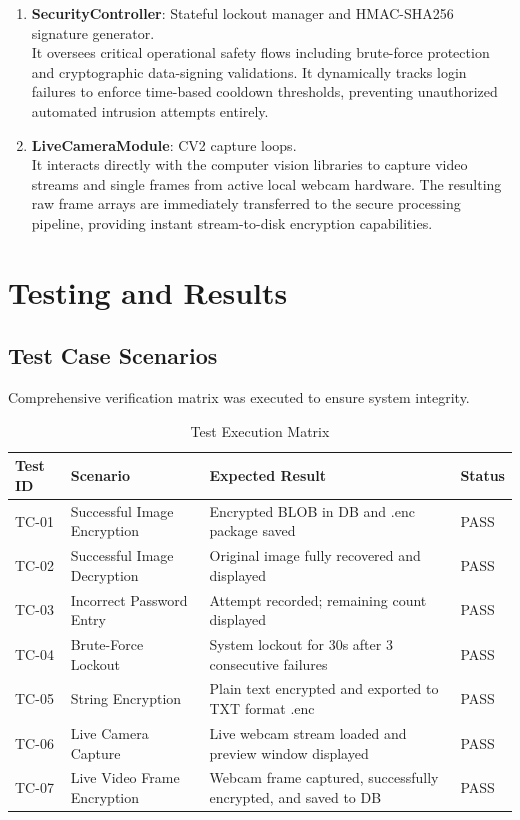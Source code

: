 \documentclass[12pt,a4paper]{report}
\begin{document}
\begin{enumerate}
    \item \textbf{SecurityController}: Stateful lockout manager and HMAC-SHA256 signature generator. \\
    It oversees critical operational safety flows including brute-force protection and cryptographic data-signing validations. It dynamically tracks login failures to enforce time-based cooldown thresholds, preventing unauthorized automated intrusion attempts entirely.
    
    \item \textbf{LiveCameraModule}: CV2 capture loops. \\
    It interacts directly with the computer vision libraries to capture video streams and single frames from active local webcam hardware. The resulting raw frame arrays are immediately transferred to the secure processing pipeline, providing instant stream-to-disk encryption capabilities.
\end{enumerate}

\chapter{Testing and Results}

\section{Test Case Scenarios}
Comprehensive verification matrix was executed to ensure system integrity.

\begin{table}[h]
\centering
\caption{Test Execution Matrix}
\begin{tabular}{|m{2cm}|m{4cm}|m{4cm}|m{3cm}|}
\hline
\textbf{Test ID} & \textbf{Scenario} & \textbf{Expected Result} & \textbf{Status} \\ \hline
TC-01 & Successful Image Encryption & Encrypted BLOB in DB and .enc package saved & PASS \\ \hline
TC-02 & Successful Image Decryption & Original image fully recovered and displayed & PASS \\ \hline
TC-03 & Incorrect Password Entry & Attempt recorded; remaining count displayed & PASS \\ \hline
TC-04 & Brute-Force Lockout & System lockout for 30s after 3 consecutive failures & PASS \\ \hline
TC-05 & String Encryption & Plain text encrypted and exported to TXT format .enc & PASS \\ \hline
TC-06 & Live Camera Capture & Live webcam stream loaded and preview window displayed & PASS \\ \hline
TC-07 & Live Video Frame Encryption & Webcam frame captured, successfully encrypted, and saved to DB & PASS \\ \hline
\end{tabular}
\end{table}
\end{document}
